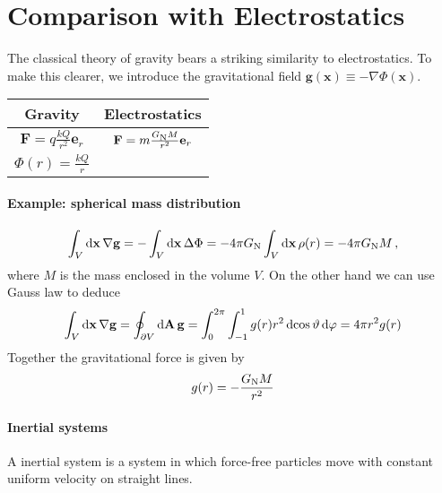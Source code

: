 \documentclass[
    a4paper,                                               %
    oneside,                                               %
    12pt,                                                  %
    headsepline,                                           %
    xcolor=dvipsnames
    ]{scrreprt}
\theoremstyle{definition}
\theoremstyle{remark}
\renewcommand{\vec}{\mathbf}
\begin{document}
 	    \section{Comparison with Electrostatics}
 	    The classical theory of gravity bears a striking similarity to electrostatics. To make this clearer, we introduce the gravitational field $\vec{g}(\vec{x})\equiv -\nabla\Phi(\vec{x})$.
 	    \begin{table}
 	    	\centering
 	    	\begin{tabular}{cc}
 	    		\toprule
 	    		Gravity&Electrostatics\\
 	    		\midrule
 	    		$\displaystyle\vec{F}=q\frac{kQ}{r^2}\vec{e}_r$&$\vec{F}=m\frac{G\textsubscript{N}M}{r^2}\vec{e}_r$\\
 	    		$\Phi(r)=\frac{kQ}{r}$&\\
 	    		\bottomrule
 	    	\end{tabular}
 	    \end{table}
 	    \paragraph{Example: spherical mass distribution}
 	    \begin{equation}
 	    	\int_V\dif{\vec{x}}\, \nabla\vec{g}=-\int_V\dif{\vec{x}}\, \Delta\Phi = -4\pi G\textsubscript{N}\int_V\dif{\vec{x}}\,\rho(r)= -4\pi G\textsubscript{N} M\, ,
 	    \end{equation}
 	    where $M$ is the mass enclosed in the volume $V$. On the other hand we can use Gauss law to deduce
   	    \begin{equation}
   	    \int_V\dif{\vec{x}}\, \nabla\vec{g}=\oint_{\partial V}\dif{\vec{A}}\, \vec{g} =\int_{0}^{2\pi}\int_{-1}^{1} g(r)r^2\dif{\cos\vartheta}\dif{\varphi}=4\pi r^2g(r)
   	    \end{equation}
   	    Together the gravitational force is given by
   	    \begin{equation}
   	    	g(r)=-\frac{G\textsubscript{N}M}{r^2}
   	    \end{equation}
   	    \paragraph{Inertial systems}
		A inertial system is a system in which force-free particles move with constant uniform velocity on straight lines. 
\end{document}
